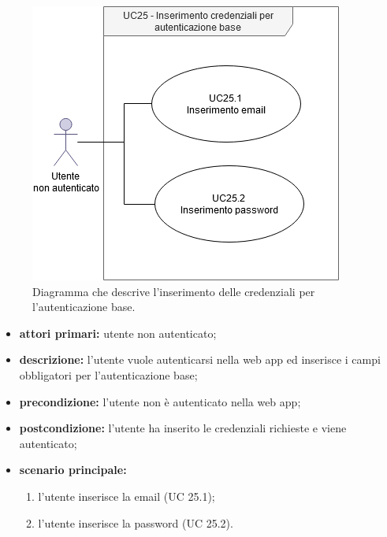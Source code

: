 		\begin{figure}[H]
			\centering
			\includegraphics[scale=0.675]{res/images/uc25}
			\caption{Diagramma che descrive l'inserimento delle credenziali per l'autenticazione base.}
		\end{figure}
		
		\begin{itemize}
			\item \textbf{attori primari:} utente non autenticato;
			\item \textbf{descrizione:} l'utente vuole autenticarsi nella web app ed inserisce i campi obbligatori per l'autenticazione base;
			\item \textbf{precondizione:} l'utente non è autenticato nella web app;
			\item \textbf{postcondizione:} l'utente ha inserito le credenziali richieste e viene autenticato;
			\item \textbf{scenario principale:}
			\begin{enumerate}
				\item l'utente inserisce la email (UC 25.1);
				\item l'utente inserisce la password (UC 25.2).
			\end{enumerate}
		\end{itemize}
		
